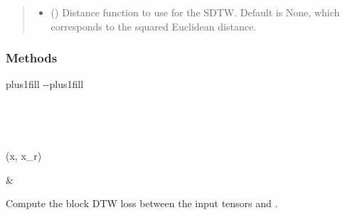 \documentclass[letterpaper,10pt,english]{sphinxmanual}
\begin{document}
\begin{fulllineitems}
\begin{quote}
\begin{description}
\begin{itemize}
\item {} 
\sphinxAtStartPar
{} (\sphinxstyleliteralemphasis{\sphinxupquote{, }}) \textendash{} Distance function to use for the SDTW. Default is None, which corresponds to the squared Euclidean distance.

\end{itemize}

\end{description}\end{quote}
\subsubsection*{Methods}


\begin{savenotes}
\sphinxatlongtablestart
\sphinxthistablewithglobalstyle
\sphinxthistablewithnovlinesstyle
\makeatletter
  \LTleft \@totalleftmargin plus1fill
  \LTright\dimexpr\columnwidth-\@totalleftmargin-\linewidth\relax plus1fill
\makeatother
\begin{longtable}{}
\sphinxtoprule
\endfirsthead

\\
\sphinxtoprule
\endhead

\sphinxbottomrule
{}\\
\endfoot

\endlastfoot
\sphinxtableatstartofbodyhook
\begin{varwidth}[t]{}
\sphinxAtStartPar
{\hyperref[\detokenize{dtw_loss_functions.block_dtw:dtw_loss_functions.block_dtw.block_dtw.forward}]{}}(x, x\_r)
\sphinxbeforeendvarwidth
\end{varwidth}%
&\begin{varwidth}[t]{}
\sphinxAtStartPar
Compute the block DTW loss between the input tensors  and .
\sphinxbeforeendvarwidth
\end{varwidth}%
\\
\sphinxbottomrule
\end{longtable}
\sphinxtableafterendhook
\sphinxatlongtableend
\end{savenotes}


\end{fulllineitems}
\end{document}

